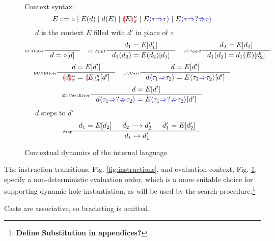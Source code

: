 \begin{figure}[H]
Context syntax:
\[E ::= \circ \mid E(d) \mid d(E) \mid \hole[E]^u_\sigma \mid E\scast{\tau}{\tau} \mid E\scasterror{\tau}{\tau}\]
\small
{}\ \ \ $d$ is the context $E$ filled with $d'$ in place of $\circ$
\tiny
\[\inference[\tiny ECOuter]{}{d = \circ[d]} \quad
\inference[\tiny ECApp1]{d_1 = E[d_1']}{d_1(d_2) = E(d_2)[d_1]}\quad
\inference[\tiny ECApp2]{d_2 = E[d_2]}{d_1(d_2) = d_1(E)[d_2']}\]
\[\inference[\tiny ECNEHole]{d=E[d']}{\hole[d]^u_\sigma = \hole[E]^u_\sigma [d']}\quad
\inference[\tiny ECCast]{d=E[d']}{d\scast{\tau_1}{\tau_2} = E\scast{\tau_1}{\tau_2}[d']}\]
\[\inference[\tiny ECCastError]{d=E[d']}{d\scasterror{\tau_1}{\tau_2} = E\scasterror{\tau_1}{\tau_2}[d']}\]
\small
{}\ \ \ $d$ steps to $d'$
\tiny
\[\inference[\tiny Step]{d_1=E[d_2] & d_2 \longrightarrow d_2' & d_1' = E[d_2']}{d_1 \mapsto d_1'}\]
\caption{Contextual dynamics of the internal language}
\label{fig:dynamics}
\end{figure}

The instruction transitions, Fig. \ref{fig:instructions}, and evaluation context, Fig. \ref{fig:dynamics}, specify a non-deterministic evaluation order, which is a more suitable choice for supporting dynamic hole instantiation, as will be used by the search procedure.\footnote{\textbf{Define Substitution in appendices?}}\par 
Casts are associative, so bracketing is omitted.

